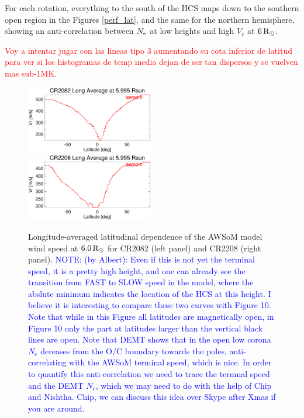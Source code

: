 \documentclass[namedreferences]{solarphysics}
\newcommand{\mrsun}{{\rm R_\odot}}
\newcommand{\Ne}{N_{\rm e}}
\def\diego#1{\textcolor{red}{#1}}
\def\notebyalbert#1{\textcolor{blue}{NOTE: #1}}
\begin{document}
\begin{article}
For each rotation, everything to the south of the HCS maps down to the southern open region in the Figures \ref{perf_lat}, and the same for the northern hemisphere, showing an anti-correlation between $\Ne$ at low heights and high $V_r$ at $6\,\mrsun$.

\diego{Voy a intentar jugar con las lineas tipo 3 aumentando su cota inferior de latitud para ver si los histogramas de temp media dejan de ser tan dispersos y se vuelven mas sub-1MK. }

\begin{figure}[h!]
\begin{center}
\includegraphics[width=0.495\textwidth]{figs/Perfil_Vr_2082_5995.eps}
\includegraphics[width=0.495\textwidth]{figs/Perfil_Vr_2208_5995.eps}
\caption{{Longitude-averaged latitudinal dependence of the AWSoM model wind speed at $6.0\,\mrsun$ for CR2082 (left panel) and CR2208 (right panel).} \notebyalbert{(by Albert): Even if this is not yet the terminal speed, it is a pretty high height, and one can already see the transition from FAST to SLOW speed in the model, where the abslute minimum indicates the location of the HCS at this height. I believe it is interesting to compare these two curves with Figure 10. Note that while in this Figure all latitudes are magnetically open, in Figure 10 only the part at latitudes larger than the vertical black lines are open. Note that DEMT shows that in the open low corona $N_e$ dereases from the O/C boundary towards the poles, anti-correlating with the AWSoM terminal speed, which is nice. In order to quantify this anti-correlation we need to trace the termnal speed and the DEMT $N_e$, which we may need to do with the help of Chip and Nishtha. Chip, we can discuss this idea over Skype after Xmas if you are around.}}
\label{perf_lon_vr}
\end{center}
\end{figure}


\end{article}
\end{document}
